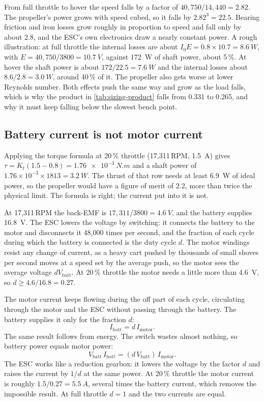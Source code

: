 From full throttle to hover the speed falls by a factor of $40{,}750/14{,}440 = 2.82$. The propeller's power grows with speed cubed, so it falls by $2.82^3 = 22.5$. Bearing friction and iron losses grow roughly in proportion to speed and fall only by about 2.8, and the ESC's own electronics draw a nearly constant power. A rough illustration: at full throttle the internal losses are about $I_0 E = 0.8 \times 10.7 = \SI{8.6}{W}$, with $E = 40{,}750/3800 = \SI{10.7}{V}$, against \SI{172}{W} of shaft power, about 5\,\%. At hover the shaft power is about $172/22.5 = \SI{7.6}{W}$ and the internal losses about $8.6/2.8 = \SI{3.0}{W}$, around 40\,\% of it. The propeller also gets worse at lower Reynolds number. Both effects push the same way and grow as the load falls, which is why the product in \cref{tab:sizing-product} falls from 0.331 to 0.265, and why it must keep falling below the slowest bench point.

\subsection{Battery current is not motor current}

Applying the torque formula at 20\,\% throttle (17,311\,RPM, \SI{1.5}{A}) gives $\tau = K_t(1.5 - 0.8) = \SI{1.76e-3}{N.m}$ and a shaft power of $1.76\times10^{-3} \times 1813 = \SI{3.2}{W}$. The thrust of that row needs at least \SI{6.9}{W} of ideal power, so the propeller would have a figure of merit of 2.2, more than twice the physical limit. The formula is right; the current put into it is not.

At 17,311\,RPM the back-EMF is $17{,}311/3800 = \SI{4.6}{V}$, and the battery supplies \SI{16.8}{V}. The ESC lowers the voltage by switching: it connects the battery to the motor and disconnects it 48,000 times per second, and the fraction of each cycle during which the battery is connected is the duty cycle $d$. The motor windings resist any change of current, as a heavy cart pushed by thousands of small shoves per second moves at a speed set by the average push, so the motor sees the average voltage $dV_\text{batt}$. At 20\,\% throttle the motor needs a little more than \SI{4.6}{V}, so $d \geq 4.6/16.8 = 0.27$.

The motor current keeps flowing during the off part of each cycle, circulating through the motor and the ESC without passing through the battery. The battery supplies it only for the fraction $d$:
\begin{equation}
I_\text{batt} = d\, I_\text{motor}.
\end{equation}
The same result follows from energy. The switch wastes almost nothing, so battery power equals motor power:
\begin{equation}
V_\text{batt}\, I_\text{batt} = (d\, V_\text{batt})\, I_\text{motor}.
\end{equation}
The ESC works like a reduction gearbox: it lowers the voltage by the factor $d$ and raises the current by $1/d$ at the same power. At 20\,\% throttle the motor current is roughly $1.5/0.27 = \SI{5.5}{A}$, several times the battery current, which removes the impossible result. At full throttle $d = 1$ and the two currents are equal.

